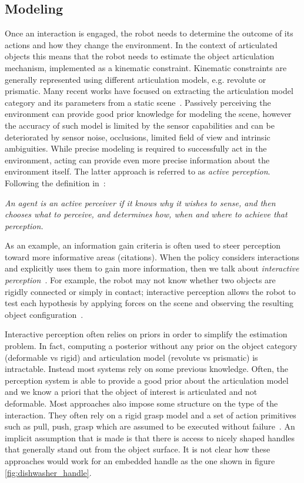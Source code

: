 \subsection{Modeling}
Once an interaction is engaged, the robot needs to determine the outcome of its actions and how they change the environment. In the context of articulated objects this means that the robot needs to estimate the object articulation mechanism, implemented as a kinematic constraint. Kinematic constraints are generally represented using different articulation models, e.g. revolute or prismatic. Many recent works have focused on extracting the articulation model category and its parameters from a static scene~\cite{abbatematteo2019learning, li2020category}. 
Passively perceiving the environment can provide good prior knowledge for modeling the scene, however the accuracy of such model is limited by the sensor capabilities and can be deteriorated by sensor noise, occlusions, limited field of view and intrinsic ambiguities. While precise modeling is required to successfully act in the environment, acting can provide even more precise information about the environment itself. The latter approach is referred to as \emph{active perception}. Following the definition in~\cite{bajcsy2018revisiting}:
\begin{displayquote}
\emph{An agent is an active perceiver if it knows why it wishes to sense, and then chooses what to perceive, and determines how, when and where to achieve that perception.}
\end{displayquote}  
As an example, an information gain criteria is often used to steer perception toward more informative areas (citations). When the policy considers interactions and explicitly uses them to gain more information, then we talk about \emph{interactive perception}~\cite{bohg2017interactive, katz2014interactive}. For example, the robot may not know whether two objects are rigidly connected or simply in contact; interactive perception allows the robot to test each hypothesis by applying forces on the scene and observing the resulting object configuration~\citep{kroemer2019review}. 

Interactive perception often relies on priors in order to simplify the estimation problem. In fact, computing a posterior without any prior on the object category (deformable vs rigid) and articulation model (revolute vs prismatic) is intractable. Instead most systems rely on some previous knowledge. Often, the perception system is able to provide a good prior about the articulation model~\cite{katz2011interactive} and we know a priori that the object of interest is articulated and not deformable. Most approaches also impose some structure on the type of the interaction. They often rely on a rigid grasp model \cite{karayiannidis2013model} and a set of action primitives such as pull, push, grasp which are assumed to be executed without failure~\cite{hausman2015active}. An implicit assumption that is made is that there is access to nicely shaped handles that generally stand out from the object surface. It is not clear how these approaches would work for an embedded handle as the one shown in figure \ref{fig:dishwasher_handle}.

